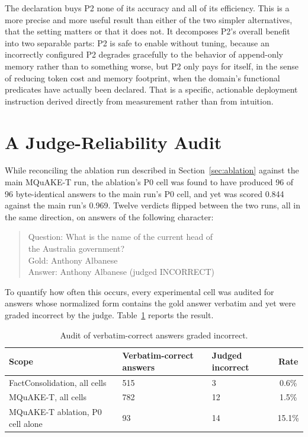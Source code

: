 The declaration buys P2 none of its accuracy and all of its efficiency. This is a more precise and more useful result than either of the two simpler alternatives, that the setting matters or that it does not. It decomposes P2's overall benefit into two separable parts: P2 is safe to enable without tuning, because an incorrectly configured P2 degrades gracefully to the behavior of append-only memory rather than to something worse, but P2 only pays for itself, in the sense of reducing token cost and memory footprint, when the domain's functional predicates have actually been declared. That is a specific, actionable deployment instruction derived directly from measurement rather than from intuition.

\section{A Judge-Reliability Audit}
\label{sec:judge-audit}

While reconciling the ablation run described in Section~\ref{sec:ablation} against the main MQuAKE-T run, the ablation's P0 cell was found to have produced 96 of 96 byte-identical answers to the main run's P0 cell, and yet was scored 0.844 against the main run's 0.969. Twelve verdicts flipped between the two runs, all in the same direction, on answers of the following character:

\begin{quote}
\small\ttfamily
Question: What is the name of the current head of \\
\quad the Australia government? \\
Gold: Anthony Albanese \\
Answer: Anthony Albanese \quad (judged INCORRECT)
\end{quote}

To quantify how often this occurs, every experimental cell was audited for answers whose normalized form contains the gold answer verbatim and yet were graded incorrect by the judge. Table~\ref{tab:judge-audit} reports the result.

\begin{table}[H]
\centering
\caption{Audit of verbatim-correct answers graded incorrect.}
\label{tab:judge-audit}
\small
\begin{tabular}{p{4.3cm}p{2.6cm}p{2cm}c}
\toprule
Scope & Verbatim-correct answers & Judged incorrect & Rate \\
\midrule
FactConsolidation, all cells & 515 & 3 & 0.6\% \\
MQuAKE-T, all cells & 782 & 12 & 1.5\% \\
MQuAKE-T ablation, P0 cell alone & 93 & 14 & 15.1\% \\
\bottomrule
\end{tabular}
\end{table}

